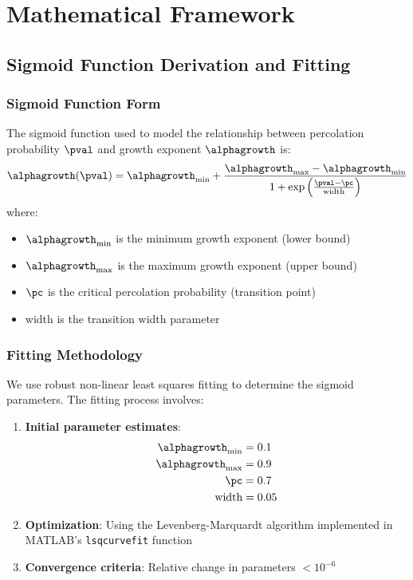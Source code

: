 \appendix
\section{Mathematical Framework}
\label{app:mathematical}

\subsection{Sigmoid Function Derivation and Fitting}

\subsubsection{Sigmoid Function Form}
The sigmoid function used to model the relationship between percolation probability $\pval$ and growth exponent $\alphagrowth$ is:
\begin{equation}
\alphagrowth(\pval) = \alphagrowth_{\min} + \frac{\alphagrowth_{\max} - \alphagrowth_{\min}}{1 + \exp\left(\frac{\pval - \pc}{\text{width}}\right)}
\end{equation}
where:
\begin{itemize}
    \item $\alphagrowth_{\min}$ is the minimum growth exponent (lower bound)
    \item $\alphagrowth_{\max}$ is the maximum growth exponent (upper bound)
    \item $\pc$ is the critical percolation probability (transition point)
    \item width is the transition width parameter
\end{itemize}

\subsubsection{Fitting Methodology}
We use robust non-linear least squares fitting to determine the sigmoid parameters. The fitting process involves:

\begin{enumerate}
    \item \textbf{Initial parameter estimates}:
    \begin{align}
    \alphagrowth_{\min} &= 0.1 \\
    \alphagrowth_{\max} &= 0.9 \\
    \pc &= 0.7 \\
    \text{width} &= 0.05
    \end{align}
    
    \item \textbf{Optimization}: Using the Levenberg-Marquardt algorithm implemented in MATLAB's \texttt{lsqcurvefit} function
    
    \item \textbf{Convergence criteria}: Relative change in parameters $< 10^{-6}$
\end{enumerate}


